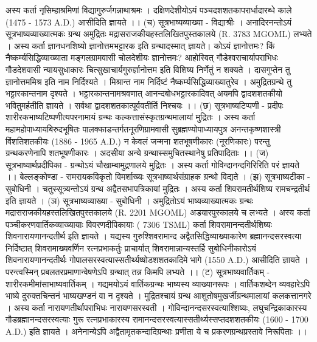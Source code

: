अस्य कर्ता नृसिम्हाश्रमिणां विद्यागुरुर्जगन्नाथाश्रमः । दक्षिणदेशीयोऽयं पञ्चदशशतकापरार्धादारब्धे काले (1475 - 1573 A.D.) आसीदिति ज्ञायते ।।
(च) सूत्रभाष्यव्याख्या - विद्याश्रीः । 
अनादिरनन्तोऽयं सूत्रभाष्यव्याख्यात्मकः ग्रन्थ अमुद्रितः मद्रासराजकीयहस्तलिखितपुस्तकालये (R. 3783 MGOML) लभ्यते । अस्य कर्ता ज्ञानधनशिष्यो ज्ञानोत्तमभट्टारक इति ग्रन्थादस्मात् ज्ञायते। कोऽयं ज्ञानोत्तमः? किं नैष्कर्म्यसिद्धिव्याख्याता मङ्गलग्रामवासी चोलदेशीयः ज्ञानोत्तमः? आहोस्वित् गौडेश्वराचार्यापराभिधः गौडदेशवासी न्यायसुधाकारः चित्सुखाचार्यगुरुर्ज्ञानोत्तम इति विशिष्य निर्णेतुं न शक्यते । दासगुप्तेन तु ज्ञानोत्तममिश्र इति नाम निर्दिश्यते । मिश्रान्त नाम निर्दिष्टं नैष्कर्म्यसिद्धिव्याख्यातुरेव । अमुद्रितग्रन्थे तु भट्टारकान्तनाम दृश्यते । भट्टारकान्तनामश्रवणात् आनन्दबोधभट्टारकादिवत् अयमपि द्वादशशतकीयो भवितुमर्हतीति ज्ञायते । सर्वथा द्वादशशतकात्पूर्ववतीर्ति निश्चयः ।।
(छ) सूत्रभाष्यटिप्पणी - प्रदीपः 
शारीरकभाष्यटिष्पणीत्यपरनामायं ग्रन्थः कल्कत्तासंस्कृतग्रन्थमालायां मुद्रितः । अस्य कर्ता महामहोपाध्यायबिरुदभूषितः पालक्काडन्तर्गतनूरणिग्रामवासी सुब्रह्मण्योपाध्यायपुत्र अनन्तकृष्णशास्त्री विंशतिशतकीयः (1886 - 1965 A.D.) न केवलं जन्मना शतभूषणीकारः (नूरणिकारः) परन्तु ग्रन्थकरणेनापि शतभूषणीकारः । अदसीया अन्ये ग्रन्थास्समुचितस्थानेषु प्रतिपादिताः ।। 
(ज) सूत्रभाष्यार्थप्रदीपिका - 
ग्रन्थोऽयं चौखाम्बामुद्रणालये मुद्रितः । अस्य कर्ता गोविन्दानन्दगिरिरिति परं ज्ञायते ।। बेल्लङ्कोण्डा - रामरायकविकृतो विमर्शाख्यः सूत्रभाष्यार्थसंग्राहक ग्रन्थो विद्यते । 
(झ) सूत्रभाष्यटीका - सुबोधिनी ।
चतुस्सूत्र्यन्तोऽयं ग्रन्थ अद्वैतसभापत्रिकायां मुद्रितः । अस्य कर्ता शिवरामतीर्थशिष्य रामचन्द्रतीर्थ इति ज्ञायते ।
(ञ) सूत्रभाष्यव्याख्या - सुबोधिनी ।
अमुद्रितोऽयं भाष्यव्याख्यात्मकः ग्रन्थः मद्रासराजकीयहस्तलिखितपुस्तकालये (R. 2201 MGOML) अडयारपुस्कालये च लभ्यते । अस्य कर्ता पञ्चीकरणवार्तिकव्याख्यायाः विवरणदीपिकायाः ( 7306 TSML) कर्ता शिवरामानन्दतीर्थशिष्यः शिवनारायणानन्दतीर्थ इति ज्ञायते । यद्यस्य गुरुश्शिवरामान्द अद्वैतसिद्धिव्याख्याकारेण ब्रह्मानन्दसरस्वत्या निर्दिष्टात् शिवरामाख्यवर्णिन रत्नप्रभाकर्तुः प्राचार्यात् शिवरामान्नान्यस्तर्हि सुबोधिनीकारोऽयं शिवनारायणानन्दतीर्थः गोपालसरस्वत्यास्सतीर्थ्यष्षोडशशतकादिमे भागे (1550 A.D.) आसीदिति ज्ञायते । परन्त्वस्मिन् प्रबलतरप्रमाणान्वेषणेऽपि ग्रन्थात् तन्न किमपि लभ्यते ।। 
(ट) सूत्रभाष्यवार्तिकम् - शारीरकमीमांसाभाष्यवार्तिकम् ।
गद्यमयोऽयं वार्तिकग्रन्थः भाष्यस्य व्याख्यानरूपः । वार्तिकशब्देन व्यवहारेऽपि भाष्ये दुरुक्तचिन्तनं भाष्यखण्डनं वा न दृश्यते । मुद्रितश्चायं ग्रन्थ आशुतोषमुखर्जीग्रन्थमालायां कलकत्तानगरे । अस्य कर्ता नारायणतीर्थापराभिधः नारायणसरस्वती । गोविन्दानन्दसरस्वत्याश्शिष्यः, लघुचन्द्रिकाकारस्य गौडब्रह्मानन्दसरस्वत्याः गुरू रत्नप्रभाकारस्य रामानन्दसरस्वत्यास्सतीर्थ्यस्सप्तदशशतकीयः (1600 - 1700 A.D.) इति ज्ञायते । अनेनान्येऽपि अद्वैतामृतकन्दादिग्रन्थाः प्रणीता ये च प्रकरणग्रन्थप्रस्तावे निरूपिताः ।। 
